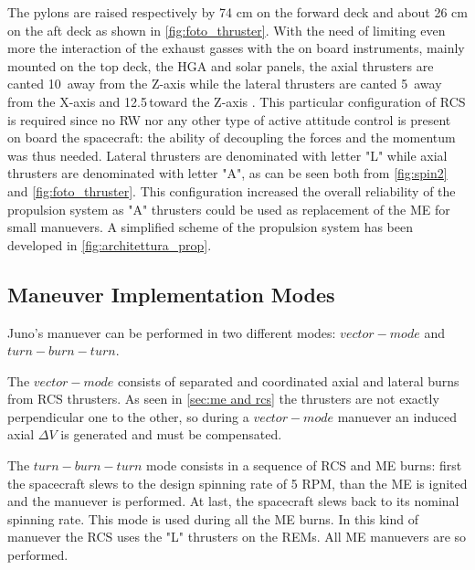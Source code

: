 

The pylons are raised respectively by 74 cm on the forward deck and about 26 cm on the aft deck as shown in \autoref{fig:foto_thruster}.
 With the need of limiting even more the interaction of the exhaust gasses with the on board instruments, mainly mounted on the top deck, the HGA and solar panels, the axial thrusters are canted 10\textdegree\, away from the Z-axis while the lateral thrusters are canted 5\textdegree\, away from the X-axis and 12.5\textdegree \,toward the Z-axis \cite{junno_inner}. This particular configuration of RCS is required since no RW nor any other type of active attitude control is present on board the spacecraft: the ability of decoupling the forces and the momentum was thus needed.
Lateral thrusters are denominated with letter "L" while axial thrusters are denominated with letter "A", as can be seen both from \autoref{fig:spin2} and \autoref{fig:foto_thruster}. This configuration increased the overall reliability of the propulsion system as "A" thrusters could be used as replacement of the ME for small manuevers. A simplified scheme of the propulsion system has been developed in \autoref{fig:architettura_prop}.


\subsection{Maneuver Implementation Modes}
\label{sec: manuever implemementation modes}

Juno's manuever can be performed in two different modes: $vector-mode$ and $turn-burn-turn$. 

The $vector-mode$ consists of separated and coordinated axial and lateral burns from RCS thrusters. As seen in \autoref{sec:me and rcs} the thrusters are not exactly perpendicular one to the other, so during a $vector-mode$ manuever an induced axial $\Delta V$ is generated and must be compensated.

The $turn-burn-turn$ mode consists in a sequence of RCS and ME burns: first the spacecraft slews to the design spinning rate of 5 RPM, than the ME is ignited and the manuever is performed. At last, the spacecraft slews back to its nominal spinning rate. This mode is used during all the ME burns. In this kind of manuever the RCS uses the "L" thrusters on the REMs. All ME manuevers are so performed. 

